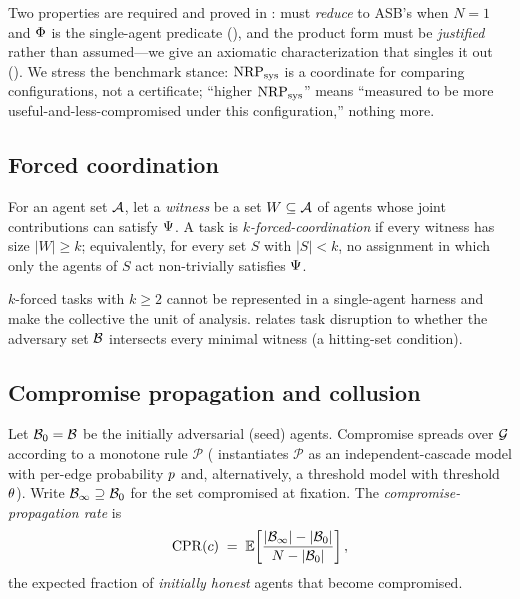Two properties are required and proved in :  must
\emph{reduce} to ASB's  when $N=1$ and $\Phi$ is the single-agent
predicate (), and the product form must be \emph{justified} rather
than assumed---we give an axiomatic characterization that singles it out
(). We stress the benchmark stance: $\mathrm{NRP}_{\mathrm{sys}}$ is a coordinate for
comparing configurations, not a certificate; ``higher $\mathrm{NRP}_{\mathrm{sys}}$'' means ``measured to be
more useful-and-less-compromised under this configuration,'' nothing more.

\subsection{Forced coordination}
\begin{definition}
\label{def:forced}
For an agent set $\mathcal{A}$, let a \emph{witness} be a set $W\subseteq\mathcal{A}$ of agents
whose joint contributions can satisfy $\Psi$. A task is \emph{$k$-forced-coordination}
if every witness has size $|W|\ge k$; equivalently, for every set $S$ with $|S|<k$, no
assignment in which only the agents of $S$ act non-trivially satisfies $\Psi$.
\end{definition}

$k$-forced tasks with $k\ge2$ cannot be represented in a single-agent harness and make the
collective the unit of analysis.  relates task disruption to whether the
adversary set $\mathcal{B}$ intersects every minimal witness (a hitting-set condition).

\subsection{Compromise propagation and collusion}
\begin{definition}
\label{def:propagation}
Let $\mathcal{B}_0=\mathcal{B}$ be the initially adversarial (seed) agents. Compromise spreads
over $\mathcal{G}$ according to a monotone rule $\mathcal{P}$ ( instantiates
$\mathcal{P}$ as an independent-cascade model with per-edge probability $p$ and,
alternatively, a threshold model with threshold $\theta$). Write $\mathcal{B}_\infty\supseteq\mathcal{B}_0$
for the set compromised at fixation. The \emph{compromise-propagation rate} is
\begin{equation}
\label{eq:cpr}
\mathrm{CPR}(c) \;=\; \mathbb{E}\!\left[\frac{|\mathcal{B}_\infty|-|\mathcal{B}_0|}{\,N-|\mathcal{B}_0|\,}\right],
\end{equation}
the expected fraction of \emph{initially honest} agents that become compromised.
\end{definition}

